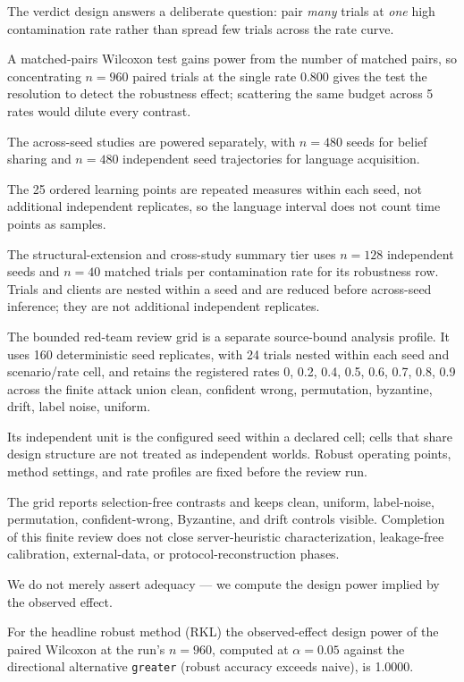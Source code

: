 \documentclass[
  english,
]{article}
\theoremstyle{plain}
\theoremstyle{definition}
\theoremstyle{remark}
\theoremstyle{definition}
\begin{document}
The verdict design answers a deliberate question: pair \emph{many}
trials at \emph{one} high contamination rate rather than spread few
trials across the rate curve.

A matched-pairs Wilcoxon test gains power from the number of matched
pairs, so concentrating \(n = 960\) paired trials at the single rate
0.800 gives the test the resolution to detect the robustness effect;
scattering the same budget across 5 rates would dilute every contrast.

The across-seed studies are powered separately, with \(n =
480\) seeds for belief sharing and \(n =
480\) independent seed trajectories for language acquisition.

The 25 ordered learning points are repeated measures within each seed,
not additional independent replicates, so the language interval does not
count time points as samples.

The structural-extension and cross-study summary tier uses \(n = 128\)
independent seeds and \(n = 40\) matched trials per contamination rate
for its robustness row. Trials and clients are nested within a seed and
are reduced before across-seed inference; they are not additional
independent replicates.

The bounded red-team review grid is a separate source-bound analysis
profile. It uses 160 deterministic seed replicates, with 24 trials
nested within each seed and scenario/rate cell, and retains the
registered rates 0, 0.2, 0.4, 0.5, 0.6, 0.7, 0.8, 0.9 across the finite
attack union clean, confident wrong, permutation, byzantine, drift,
label noise, uniform.

Its independent unit is the configured seed within a declared cell;
cells that share design structure are not treated as independent worlds.
Robust operating points, method settings, and rate profiles are fixed
before the review run.

The grid reports selection-free contrasts and keeps clean, uniform,
label-noise, permutation, confident-wrong, Byzantine, and drift controls
visible. Completion of this finite review does not close
server-heuristic characterization, leakage-free calibration,
external-data, or protocol-reconstruction phases.

We do not merely assert adequacy --- we compute the design power implied
by the observed effect.

For the headline robust method (RKL) the observed-effect design power of
the paired Wilcoxon at the run's \(n = 960\), computed at
\(\alpha = 0.05\) against the directional alternative \texttt{greater}
(robust accuracy exceeds naive), is 1.0000.
\end{document}
